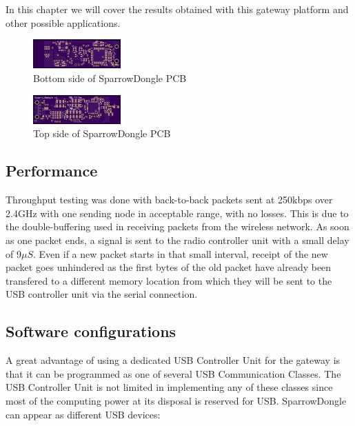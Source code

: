 \label{chap:results}

In this chapter we will cover the results obtained with this gateway platform
and other possible applications.

\begin{figure}[ht] \centering
\includegraphics[width=0.3\textwidth]{img/dongleb.png} \caption{Bottom side of
SparrowDongle PCB} \end{figure}


\begin{figure}[ht] \centering
\includegraphics[width=0.3\textwidth]{img/donglef.png} \caption{Top side of
SparrowDongle PCB} \end{figure}

\subsection{Performance}

Throughput testing was done with back-to-back packets sent at 250kbps over
2.4GHz with one sending node in acceptable range, with no losses. This is due
to the double-buffering used in receiving packets from the wireless network.
As soon as one packet ends, a signal is sent to the radio controller unit with
a small delay of 9$\mu S$. Even if a new packet starts in that small interval,
receipt of the new packet goes unhindered as the first bytes of the old packet
have already been transfered to a different memory location from which they
will be sent to the USB controller unit via the serial connection.

\subsection{Software configurations}

A great advantage of using a dedicated USB Controller Unit for the gateway is
that it can be programmed as one of several USB Communication Classes. The USB
Controller Unit is not limited in implementing any of these classes since most
of the computing power at its disposal is reserved for USB.  SparrowDongle can
appear as different USB devices:

